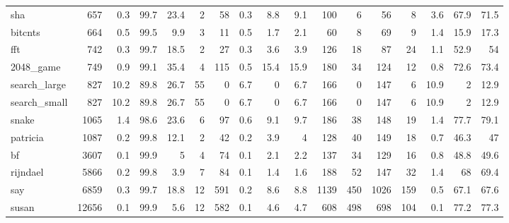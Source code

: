 \begin{tabular}{lrrrrrrrrrrrrrrrr}
 sha             &            657 &    0.3 &        99.7 &   23.4 &     2 &      58 &    0.3 &      8.8 &           9.1 &  100 &         6 &       56 &    8 &    3.6 &     67.9 &          71.5 \\
 bitcnts         &            664 &    0.5 &        99.5 &    9.9 &     3 &      11 &    0.5 &      1.7 &           2.1 &   60 &         8 &       69 &    9 &    1.4 &     15.9 &          17.3 \\
 fft             &            742 &    0.3 &        99.7 &   18.5 &     2 &      27 &    0.3 &      3.6 &           3.9 &  126 &        18 &       87 &   24 &    1.1 &     52.9 &          54   \\
 2048\_game       &            749 &    0.9 &        99.1 &   35.4 &     4 &     115 &    0.5 &     15.4 &          15.9 &  180 &        34 &      124 &   12 &    0.8 &     72.6 &          73.4 \\
 search\_large    &            827 &   10.2 &        89.8 &   26.7 &    55 &       0 &    6.7 &      0   &           6.7 &  166 &         0 &      147 &    6 &   10.9 &      2   &          12.9 \\
 search\_small    &            827 &   10.2 &        89.8 &   26.7 &    55 &       0 &    6.7 &      0   &           6.7 &  166 &         0 &      147 &    6 &   10.9 &      2   &          12.9 \\
 snake           &           1065 &    1.4 &        98.6 &   23.6 &     6 &      97 &    0.6 &      9.1 &           9.7 &  186 &        38 &      148 &   19 &    1.4 &     77.7 &          79.1 \\
 patricia        &           1087 &    0.2 &        99.8 &   12.1 &     2 &      42 &    0.2 &      3.9 &           4   &  128 &        40 &      149 &   18 &    0.7 &     46.3 &          47   \\
 bf              &           3607 &    0.1 &        99.9 &    5   &     4 &      74 &    0.1 &      2.1 &           2.2 &  137 &        34 &      129 &   16 &    0.8 &     48.8 &          49.6 \\
 rijndael        &           5866 &    0.2 &        99.8 &    3.9 &     7 &      84 &    0.1 &      1.4 &           1.6 &  188 &        52 &      147 &   32 &    1.4 &     68   &          69.4 \\
 say             &           6859 &    0.3 &        99.7 &   18.8 &    12 &     591 &    0.2 &      8.6 &           8.8 & 1139 &       450 &     1026 &  159 &    0.5 &     67.1 &          67.6 \\
 susan           &          12656 &    0.1 &        99.9 &    5.6 &    12 &     582 &    0.1 &      4.6 &           4.7 &  608 &       498 &      698 &  104 &    0.1 &     77.2 &          77.3 \\

\end{tabular}
